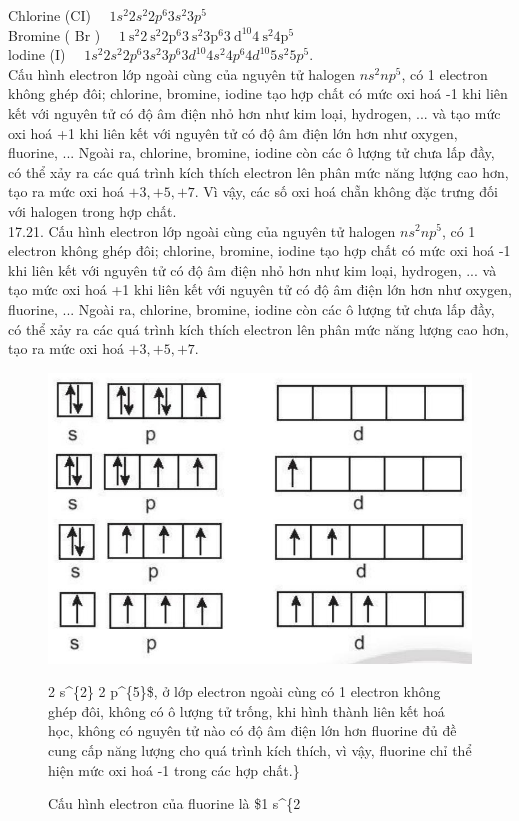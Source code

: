 \documentclass[10pt]{article}
\begin{document}
Chlorine (CI) $\quad 1 s^{2} 2 s^{2} 2 p^{6} 3 s^{2} 3 p^{5}$\\
Bromine ( Br ) $\quad 1 \mathrm{~s}^{2} 2 \mathrm{~s}^{2} 2 \mathrm{p}^{6} 3 \mathrm{~s}^{2} 3 \mathrm{p}^{6} 3 \mathrm{~d}^{10} 4 \mathrm{~s}^{2} 4 \mathrm{p}^{5}$\\
lodine (I) $\quad 1 s^{2} 2 s^{2} 2 p^{6} 3 s^{2} 3 p^{6} 3 d^{10} 4 s^{2} 4 p^{6} 4 d^{10} 5 s^{2} 5 p^{5}$.\\
Cấu hình electron lớp ngoài cùng của nguyên tử halogen $n s^{2} n p^{5}$, có 1 electron không ghép đôi; chlorine, bromine, iodine tạo hợp chất có mức oxi hoá -1 khi liên kết với nguyên tử có độ âm điện nhỏ hơn như kim loại, hydrogen, ... và tạo mức oxi hoá +1 khi liên kết với nguyên tử có độ âm điện lớn hơn như oxygen, fluorine, ... Ngoài ra, chlorine, bromine, iodine còn các ô lượng tử chưa lấp đầy, có thể xảy ra các quá trình kích thích electron lên phân mức năng lượng cao hơn, tạo ra mức oxi hoá $+3,+5,+7$. Vì vậy, các số oxi hoá chẵn không đặc trưng đối với halogen trong hợp chất.\\
17.21. Cấu hình electron lớp ngoài cùng của nguyên tử halogen $n s^{2} n p^{5}$, có 1 electron không ghép đôi; chlorine, bromine, iodine tạo hợp chất có mức oxi hoá -1 khi liên kết với nguyên tử có độ âm điện nhỏ hơn như kim loại, hydrogen, ... và\\
tạo mức oxi hoá +1 khi liên kết với nguyên tử có độ âm điện lớn hơn như oxygen, fluorine, ... Ngoài ra, chlorine, bromine, iodine còn các ô lượng tử chưa lấp đầy, có thể xảy ra các quá trình kích thích electron lên phân mức năng lượng cao hơn, tạo ra mức oxi hoá $+3,+5,+7$.

\begin{figure}[h]
\begin{center}
  \includegraphics[width=\textwidth]{2025_10_23_57761e23b8c46a11c3efg-58}
\captionsetup{labelformat=empty}
\caption{Cấu hình electron của fluorine là \$1 s\^{}\{2} 2 s\^{}\{2\} 2 p\^{}\{5\}\$, ở lớp electron ngoài cùng có 1 electron không ghép đôi, không có ô lượng tử trống, khi hình thành liên kết hoá học, không có nguyên tử nào có độ âm điện lớn hơn fluorine đủ đề cung cấp năng lượng cho quá trình kích thích, vì vậy, fluorine chỉ thể hiện mức oxi hoá -1 trong các hợp chất.\}\end{center}
\end{figure}
\end{document}
